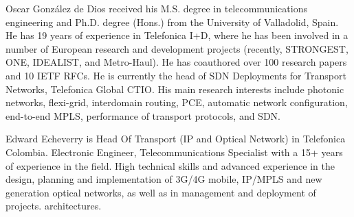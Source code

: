 \documentclass[10pt, conference]{IEEEtran}
\begin{document}
\begin{IEEEbiography}%
{Oscar González de Dios} received his M.S. degree in telecommunications engineering and Ph.D. degree (Hons.) from the University of Valladolid, Spain. He has 19 years of experience in Telefonica I+D, where he has been involved in a number of European research and development projects (recently, STRONGEST, ONE, IDEALIST, and Metro-Haul). He has coauthored over 100 research papers and 10 IETF RFCs. He is currently the head of SDN Deployments for Transport Networks, Telefonica Global CTIO. His main research interests include photonic networks, flexi-grid, interdomain routing, PCE, automatic network configuration, end-to-end MPLS, performance of transport protocols, and SDN. \end{IEEEbiography}

\begin{IEEEbiography}%
{Edward Echeverry} is Head Of Transport (IP and Optical Network) in Telefonica Colombia. Electronic Engineer, Telecommunications Specialist with a 15+ years of experience in the field. High technical skills and advanced experience in the design, planning and implementation of 3G/4G mobile, IP/MPLS and new generation optical networks, as well as in management and deployment of projects. architectures.\end{IEEEbiography}
\end{document}
